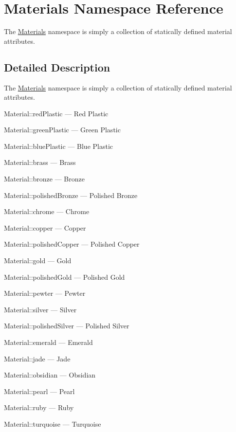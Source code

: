 \hypertarget{namespace_materials}{}\section{Materials Namespace Reference}
\label{namespace_materials}


The \hyperlink{namespace_materials}{Materials} namespace is simply a collection of statically defined material attributes.  




\subsection{Detailed Description}
The \hyperlink{namespace_materials}{Materials} namespace is simply a collection of statically defined material attributes. 


\begin{DoxyItemize}
\item Material\+::red\+Plastic --- Red Plastic
\item Material\+::green\+Plastic --- Green Plastic
\item Material\+::blue\+Plastic --- Blue Plastic
\item Material\+::brass --- Brass
\item Material\+::bronze --- Bronze
\item Material\+::polished\+Bronze --- Polished Bronze
\item Material\+::chrome --- Chrome
\item Material\+::copper --- Copper
\item Material\+::polished\+Copper --- Polished Copper
\item Material\+::gold --- Gold
\item Material\+::polished\+Gold --- Polished Gold
\item Material\+::pewter --- Pewter
\item Material\+::silver --- Silver
\item Material\+::polished\+Silver --- Polished Silver
\item Material\+::emerald --- Emerald
\item Material\+::jade --- Jade
\item Material\+::obsidian --- Obsidian
\item Material\+::pearl --- Pearl
\item Material\+::ruby --- Ruby
\item Material\+::turquoise --- Turquoise 
\end{DoxyItemize}